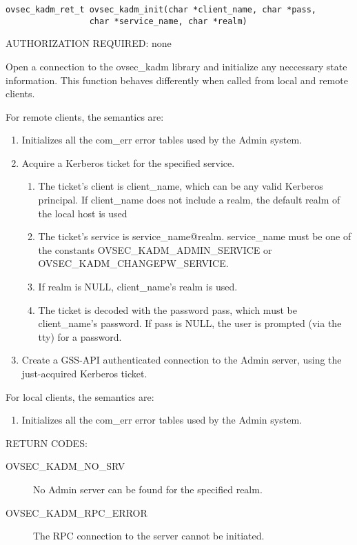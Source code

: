 \begin{verbatim}
ovsec_kadm_ret_t ovsec_kadm_init(char *client_name, char *pass,
				 char *service_name, char *realm)
\end{verbatim}

AUTHORIZATION REQUIRED: none

Open a connection to the ovsec_kadm library and initialize any
neccessary state information.  This function behaves differently when
called from local and remote clients.

For remote clients, the semantics are:

\begin{enumerate}
\item Initializes all the com_err error tables used by the Admin
system.

\item Acquire a Kerberos ticket for the specified service.

\begin{enumerate}
\item The ticket's client is client_name, which can be any valid
Kerberos principal.  If client_name does not include a realm, the
default realm of the local host is used
\item The ticket's service is service_name@realm.  service_name must
be one of the constants OVSEC_KADM_ADMIN_SERVICE or
OVSEC_KADM_CHANGEPW_SERVICE.
\item If realm is NULL, client_name's realm is used.
\item The ticket is decoded with the password pass, which must be
client_name's password.  If pass is NULL, the user is prompted (via
the tty) for a password.
\end{enumerate}

\item Create a GSS-API authenticated connection to the Admin server,
using the just-acquired Kerberos ticket.
\end{enumerate}

For local clients, the semantics are:

\begin{enumerate}
\item Initializes all the com_err error tables used by the Admin
system.
\end{enumerate}

RETURN CODES: 

\begin{description}
\item[OVSEC_KADM_NO_SRV] No Admin server can be found for the
specified realm.

\item[OVSEC_KADM_RPC_ERROR] The RPC connection to the server cannot be
initiated.
\end{description}

